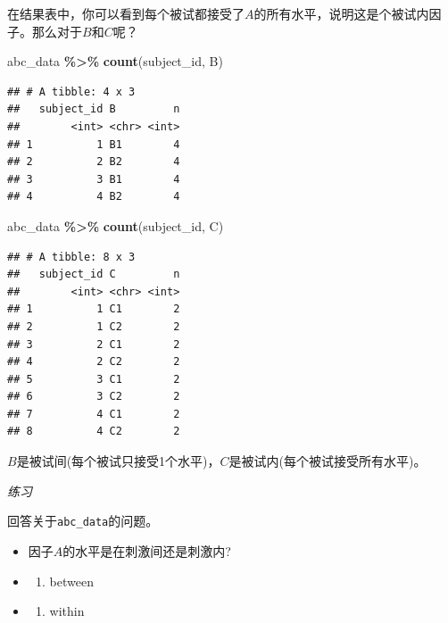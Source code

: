\documentclass[
]{book}
\newenvironment{Shaded}{\begin{snugshade}}{\end{snugshade}}
\newcommand{\FunctionTok}[1]{\textcolor[rgb]{0.13,0.29,0.53}{\textbf{#1}}}
\newcommand{\NormalTok}[1]{#1}
\newcommand{\SpecialCharTok}[1]{\textcolor[rgb]{0.81,0.36,0.00}{\textbf{#1}}}
\providecommand{\tightlist}{%
  \setlength{\itemsep}{0pt}\setlength{\parskip}{0pt}}
\begin{document}
在结果表中，你可以看到每个被试都接受了\(A\)的所有水平，说明这是个被试内因子。那么对于\(B\)和\(C\)呢？

\begin{Shaded}
\begin{Highlighting}[]
\NormalTok{abc\_data }\SpecialCharTok{\%\textgreater{}\%}
  \FunctionTok{count}\NormalTok{(subject\_id, B)}
\end{Highlighting}
\end{Shaded}

\begin{verbatim}
## # A tibble: 4 x 3
##   subject_id B         n
##        <int> <chr> <int>
## 1          1 B1        4
## 2          2 B2        4
## 3          3 B1        4
## 4          4 B2        4
\end{verbatim}

\begin{Shaded}
\begin{Highlighting}[]
\NormalTok{abc\_data }\SpecialCharTok{\%\textgreater{}\%}
  \FunctionTok{count}\NormalTok{(subject\_id, C)}
\end{Highlighting}
\end{Shaded}

\begin{verbatim}
## # A tibble: 8 x 3
##   subject_id C         n
##        <int> <chr> <int>
## 1          1 C1        2
## 2          1 C2        2
## 3          2 C1        2
## 4          2 C2        2
## 5          3 C1        2
## 6          3 C2        2
## 7          4 C1        2
## 8          4 C2        2
\end{verbatim}

\(B\)是被试间(每个被试只接受1个水平)，\(C\)是被试内(每个被试接受所有水平)。

\emph{练习}

回答关于\texttt{abc\_data}的问题。

\begin{itemize}
\item
  因子\(A\)的水平是在刺激间还是刺激内?
\item
  \begin{enumerate}
  \def\labelenumi{(\Alph{enumi})}
  \tightlist
  \item
    between\\
  \end{enumerate}
\item
  \begin{enumerate}
  \def\labelenumi{(\Alph{enumi})}
  \setcounter{enumi}{1}
  \tightlist
  \item
    within
  \end{enumerate}
\end{itemize}
\end{document}
